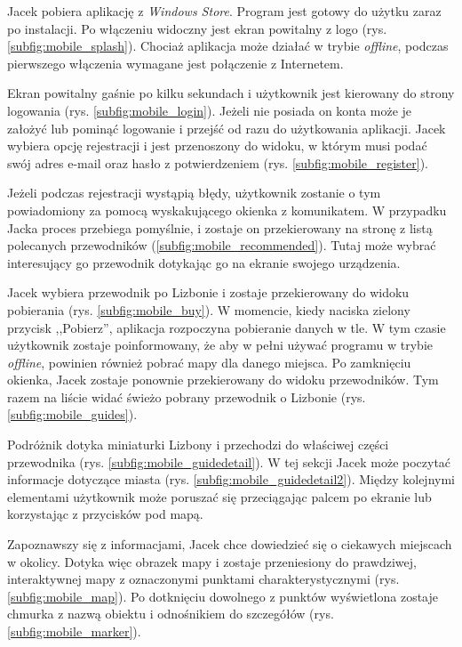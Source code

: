 \documentclass{book}
\begin{document}
		Jacek pobiera aplikację z \emph{Windows Store}. Program jest gotowy do użytku zaraz po instalacji. Po włączeniu widoczny jest ekran powitalny z logo (rys.\ref{subfig:mobile_splash}). Chociaż aplikacja może działać w trybie \emph{offline}, podczas pierwszego włączenia wymagane jest połączenie z Internetem. 
		
		Ekran powitalny gaśnie po kilku sekundach i użytkownik jest kierowany do strony logowania (rys. \ref{subfig:mobile_login}). Jeżeli nie posiada on konta może je założyć lub pominąć logowanie i przejść od razu do użytkowania aplikacji. Jacek wybiera opcję rejestracji i jest przenoszony do widoku, w którym musi podać swój adres e-mail oraz hasło z potwierdzeniem (rys. \ref{subfig:mobile_register}). 
		
		Jeżeli podczas rejestracji wystąpią błędy, użytkownik zostanie o tym powiadomiony za pomocą wyskakującego okienka z komunikatem. W przypadku Jacka proces przebiega pomyślnie, i zostaje on przekierowany na stronę z listą polecanych przewodników (\ref{subfig:mobile_recommended}). Tutaj może wybrać interesujący go przewodnik dotykając go na ekranie swojego urządzenia.
		
		Jacek wybiera przewodnik po Lizbonie i zostaje przekierowany do widoku pobierania (rys. \ref{subfig:mobile_buy}). W momencie, kiedy naciska zielony przycisk ,,Pobierz'', aplikacja rozpoczyna pobieranie danych w tle. W tym czasie użytkownik zostaje poinformowany, że aby w pełni używać programu w trybie \emph{offline}, powinien również pobrać mapy dla danego miejsca. Po zamknięciu okienka, Jacek zostaje ponownie przekierowany do widoku przewodników. Tym razem na liście widać świeżo pobrany przewodnik o Lizbonie (rys. \ref{subfig:mobile_guides}). 
		
		Podróżnik dotyka miniaturki Lizbony i przechodzi do właściwej części przewodnika (rys. \ref{subfig:mobile_guidedetail}). W tej sekcji Jacek może poczytać informacje dotyczące miasta (rys. \ref{subfig:mobile_guidedetail2}). Między kolejnymi elementami użytkownik może poruszać się przeciągając palcem po ekranie lub korzystając z przycisków pod mapą. 
		
		Zapoznawszy się z informacjami, Jacek chce dowiedzieć się o ciekawych miejscach w okolicy. Dotyka więc obrazek mapy i zostaje przeniesiony do prawdziwej, interaktywnej mapy z oznaczonymi punktami charakterystycznymi (rys. \ref{subfig:mobile_map}). Po dotknięciu dowolnego z punktów wyświetlona zostaje chmurka z nazwą obiektu i odnośnikiem do szczegółów (rys. \ref{subfig:mobile_marker}). 
		
\end{document}
